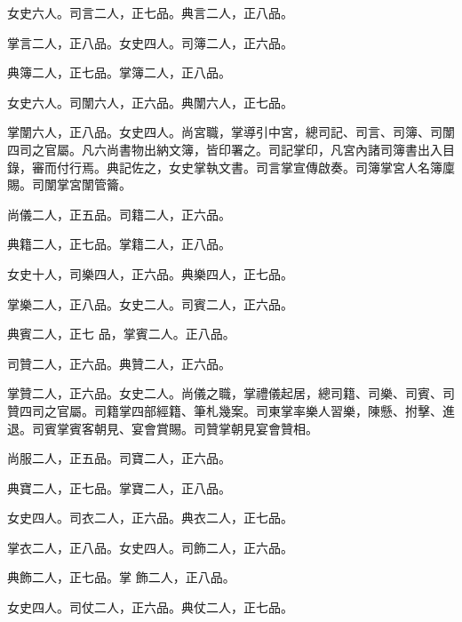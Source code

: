 \begin{pinyinscope}
 女史六人。司言二人，正七品。典言二人，正八品。



 掌言二人，正八品。女史四人。司簿二人，正六品。



 典簿二人，正七品。掌簿二人，正八品。



 女史六人。司闈六人，正六品。典闈六人，正七品。



 掌闈六人，正八品。女史四人。尚宮職，掌導引中宮，總司記、司言、司簿、司闈四司之官屬。凡六尚書物出納文簿，皆印署之。司記掌印，凡宮內諸司簿書出入目錄，審而付行焉。典記佐之，女史掌執文書。司言掌宣傳啟奏。司簿掌宮人名簿廩賜。司闈掌宮闈管籥。



 尚儀二人，正五品。司籍二人，正六品。



 典籍二人，正七品。掌籍二人，正八品。



 女史十人，司樂四人，正六品。典樂四人，正七品。



 掌樂二人，正八品。女史二人。司賓二人，正六品。



 典賓二人，正七
 品，掌賓二人。正八品。



 司贊二人，正六品。典贊二人，正六品。



 掌贊二人，正六品。女史二人。尚儀之職，掌禮儀起居，總司籍、司樂、司賓、司贊四司之官屬。司籍掌四部經籍、筆札幾案。司東掌率樂人習樂，陳懸、拊擊、進退。司賓掌賓客朝見、宴會賞賜。司贊掌朝見宴會贊相。



 尚服二人，正五品。司寶二人，正六品。



 典寶二人，正七品。掌寶二人，正八品。



 女史四人。司衣二人，正六品。典衣二人，正七品。



 掌衣二人，正八品。女史四人。司飾二人，正六品。



 典飾二人，正七品。掌
 飾二人，正八品。



 女史四人。司仗二人，正六品。典仗二人，正七品。




\end{pinyinscope}
